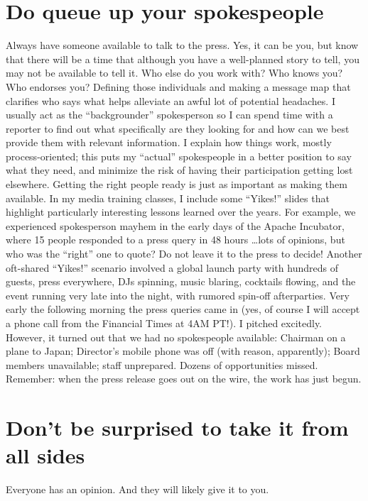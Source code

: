 \section*{Do queue up your spokespeople}
Always have someone available to talk to the press. Yes, it can be you, but know
that there will be a time that although you have a well-planned story to tell,
you may not be available to tell it. Who else do you work with? Who knows you?
Who endorses you? Defining those individuals and making a message map that
clarifies who says what helps alleviate an awful lot of potential headaches. I
usually act as the ``backgrounder'' spokesperson so I can spend time with a
reporter to find out what specifically are they looking for and how can we best
provide them with relevant information. I explain how things work, mostly
process-oriented; this puts my ``actual'' spokespeople in a better position to say
what they need, and minimize the risk of having their participation getting lost
elsewhere. Getting the right people ready is just as important as making them
available. In my media training classes, I include some ``Yikes!'' slides that
highlight particularly interesting lessons learned over the years. For example,
we experienced spokesperson mayhem in the early days of the Apache Incubator, where
15 people responded to a press query in 48 hours \dots lots of opinions, but who was the
``right'' one to quote? Do not leave it to the press to decide! Another oft-shared
``Yikes!'' scenario involved a global launch party with hundreds of guests, press
everywhere, DJs spinning, music blaring, cocktails flowing, and the event
running very late into the night, with rumored spin-off afterparties. Very early
the following morning the press queries came in (yes, of course I will accept a
phone call from the Financial Times at 4AM PT!). I pitched excitedly. However,
it turned out that we had no spokespeople available: Chairman on a plane to
Japan; Director's mobile phone was off (with reason, apparently); Board members
unavailable; staff unprepared. Dozens of opportunities missed. Remember: when
the press release goes out on the wire, the work has just begun.

\section*{Don't be surprised to take it from all sides}
Everyone has an opinion. And they will likely give it to you.

